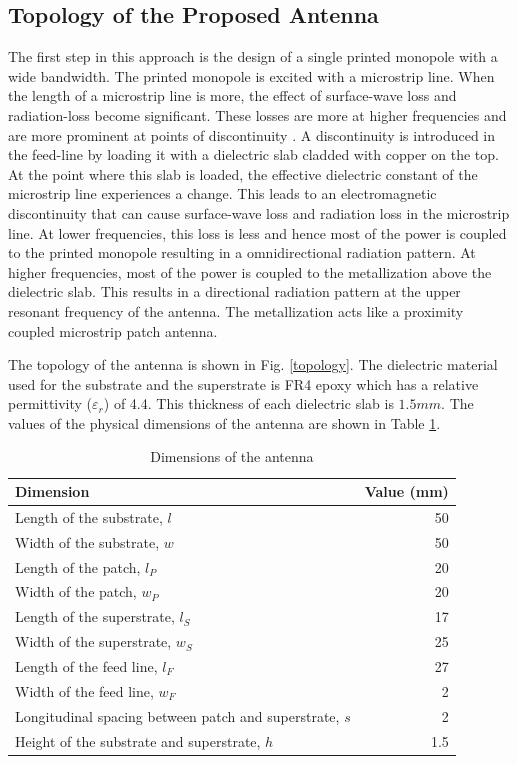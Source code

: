 \subsection{Topology of the Proposed Antenna}
The first step in this approach is the design of a single printed monopole with a wide bandwidth. The printed monopole is excited with a microstrip line. When the length of a microstrip line is more, the effect of surface-wave loss and radiation-loss become significant. These losses are more at higher frequencies and are more prominent at points of discontinuity \cite{rad_loss}. A discontinuity is introduced in the feed-line by loading it with a dielectric slab cladded with copper on the top. At the point where this slab is loaded, the effective dielectric constant of the microstrip line experiences a change. This leads to an electromagnetic discontinuity that can cause surface-wave loss and radiation loss in the microstrip line. At lower frequencies, this loss is less and hence most of the power is coupled to the printed monopole resulting in a omnidirectional radiation pattern. At higher frequencies, most of the power is coupled to the metallization above the dielectric slab. This results in a directional radiation pattern at the upper resonant frequency of the antenna. The metallization acts like a proximity coupled microstrip patch antenna.

The topology of the antenna is shown in Fig. \ref{topology}. The dielectric material used for the substrate and the superstrate is FR4 epoxy which has a relative permittivity ($\varepsilon_r$) of 4.4. This thickness of each dielectric slab is $1.5mm$. The values of the physical dimensions of the antenna are shown in Table \ref{table-dims}.
\begin{table}
\centering
\caption{Dimensions of the antenna} \label{table-dims}
\begin{tabular}{|l|r|}
\hline
\textbf{Dimension} & \textbf{Value (mm)} \\ \hline
Length of the substrate, $l$ & 50 \\ \hline
Width of the substrate, $w$ & 50 \\ \hline
Length of the patch, $l_P$ & 20 \\ \hline
Width of the patch, $w_P$ & 20 \\ \hline
Length of the superstrate, $l_S$ & 17 \\ \hline
Width of the superstrate, $w_S$ & 25 \\ \hline
Length of the feed line, $l_F$ & 27 \\ \hline
Width of the feed line, $w_F$ & 2 \\ \hline
Longitudinal spacing between patch and superstrate, $s$ & 2 \\ \hline
Height of the substrate and superstrate, $h$ & 1.5 \\ \hline
\end{tabular}
\end{table}

